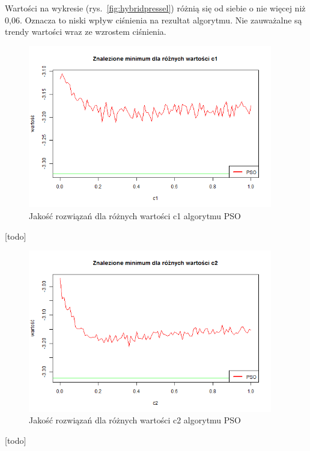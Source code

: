\documentclass[11pt, a4paper]{article}
\newcommand{\fbi}{\leavevmode{\parindent=1em\indent}}
\begin{document}
\fbi
Wartości na wykresie (rys.~\ref{fig:hybridpressel}) różnią się od siebie o nie więcej niż 0,06. Oznacza to niski wpływ ciśnienia na rezultat algorytmu. Nie zauważalne są trendy wartości wraz ze wzrostem ciśnienia.


\begin{figure}[H]
	\centering
	\includegraphics[width=0.95\textwidth]{./assets/Hartman6c1.png}
	\caption{Jakość rozwiązań dla różnych wartości c1 algorytmu PSO}
	\label{fig:psoc1}
\end{figure}

\fbi
[todo]


\begin{figure}[H]
	\centering
	\includegraphics[width=0.95\textwidth]{./assets/Hartman6c2.png}
	\caption{Jakość rozwiązań dla różnych wartości c2 algorytmu PSO}
	\label{fig:psoc2}
\end{figure}

\fbi
[todo]

\newpage
\end{document}

